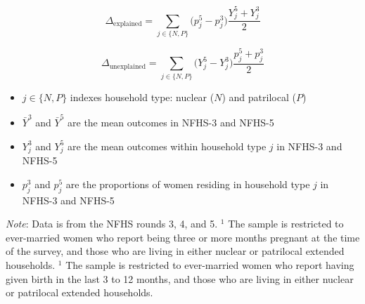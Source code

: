 \documentclass[10pt,twoside,reqno]{article}
\begin{document}
\begin{equation}
\Delta_{\text{explained}} =
\sum_{j \in \{N,P\}} \big(p_j^{5} - p_j^{3}\big)\frac{Y_j^{5} + Y_j^{3}}{2}
\end{equation}

\begin{equation}
\Delta_{\text{unexplained}} =
\sum_{j \in \{N,P\}} \big(Y_j^{5} - Y_j^{3}\big)\frac{p_j^{5} + p_j^{3}}{2}
\end{equation}

\begin{itemize}
    \item $j \in \{N,P\}$ indexes household type: nuclear ($N$) and patrilocal ($P$)
    \item $\bar Y^{3}$ and $\bar Y^{5}$ are the mean outcomes in NFHS-3 and NFHS-5
    \item $Y_j^{3}$ and $Y_j^{5}$ are the mean outcomes within household type $j$ in NFHS-3 and NFHS-5
    \item $p_j^{3}$ and $p_j^{5}$ are the proportions of women residing in household type $j$ in NFHS-3 and NFHS-5
\end{itemize}

\begin{table}[H]
\sansmath
\sffamily
\captionsetup{style=CAPTAB}
\caption{:  None of the improvement in the outcomes is explained by changing composition in household structures}
\label{tab:decomposition}
\vspace{-4pt}

\begin{scriptsize}
\setlength{\tabcolsep}{10pt}
\renewcommand{\arraystretch}{2.5}
\centering

\end{scriptsize}

\vspace{1ex}
\small\scriptsize{\textsf{\textit{Note}: Data is from the NFHS rounds 3, 4, and 5.}}
\newline\small\scriptsize{\textsf{$^1$ The sample is restricted to ever-married women who report being three or more months pregnant at the time of the survey, and those who are living in either nuclear or patrilocal extended households.}}
\newline\small\scriptsize{\textsf{$^1$ The sample is restricted to ever-married women who report having given birth in the last 3 to 12 months, and those who are living in either nuclear or patrilocal extended households.}}

\end{table}


\cleardoublepage
\end{document}
